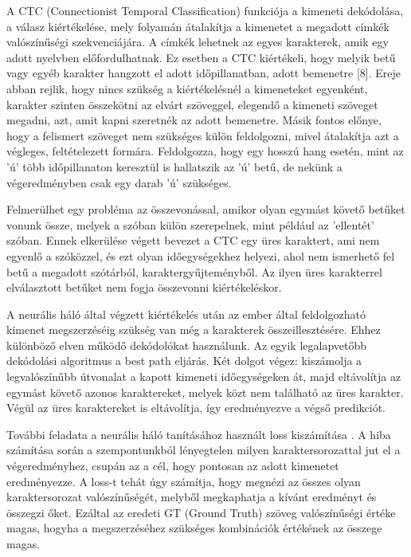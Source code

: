 A CTC (Connectionist Temporal Classification) \cite{ctc} funkciója a kimeneti dekódolása, a válasz kiértékelése, mely folyamán átalakítja a kimenetet a megadott címkék valószínűségi szekvenciájára. A címkék lehetnek az egyes karakterek, amik egy adott nyelvben előfordulhatnak. Ez esetben a CTC kiértékeli, hogy melyik betű vagy egyéb karakter hangzott el adott időpillanatban, adott bemenetre [8]. Ereje abban rejlik, hogy nincs szükség a kiértékelésnél a kimeneteket egyenként, karakter szinten összekötni az elvárt szöveggel, elegendő a kimeneti szöveget megadni, azt, amit kapni szeretnék az adott bemenetre. Másik fontos előnye, hogy a felismert szöveget nem szükséges külön feldolgozni, mivel átalakítja azt a végleges, feltételezett formára. Feldolgozza, hogy egy hosszú hang esetén, mint az ’ú’ több időpillanaton keresztül is hallatszik az ’ú’ betű, de nekünk a végeredményben csak egy darab ’ú’ szükséges.

Felmerülhet egy probléma az összevonással, amikor olyan egymást követő betűket vonunk össze, melyek a szóban külön szerepelnek, mint például az ’ellentét’ szóban. Ennek elkerülése végett bevezet a CTC egy üres karaktert, ami nem egyenlő a szóközzel, és ezt olyan időegységekhez helyezi, ahol nem ismerhető fel betű a megadott szótárból, karaktergyűjteményből. Az ilyen üres karakterrel elválasztott betűket nem fogja összevonni kiértékeléskor.

A neurális háló által végzett kiértékelés után az ember által feldolgozható kimenet megszerzéséig szükség van még a karakterek összeillesztésére. Ehhez különböző elven működő dekódolókat használunk. Az egyik legalapvetőbb dekódolási algoritmus a best path eljárás. Két dolgot végez: kiszámolja a legvalószínűbb útvonalat a kapott kimeneti időegységeken át, majd eltávolítja az egymást követő azonos karaktereket, melyek közt nem található az üres karakter. Végül az üres karaktereket is eltávolítja, így eredményezve a végső predikciót.

További feladata a neurális háló tanításához használt loss kiszámítása \cite{ctc_sid}. A hiba számítása során a szempontunkból lényegtelen milyen karaktersorozattal jut el a végeredményhez, csupán az a cél, hogy pontosan az adott kimenetet eredményezze. A loss-t tehát úgy számítja, hogy megnézi az összes olyan karaktersorozat valószínűségét, melyből megkaphatja a kívánt eredményt és összegzi őket. Ezáltal az eredeti GT (Ground Truth) szöveg valószínűségi értéke magas, hogyha a megszerzéséhez szükséges kombinációk értékének az összege magas.

